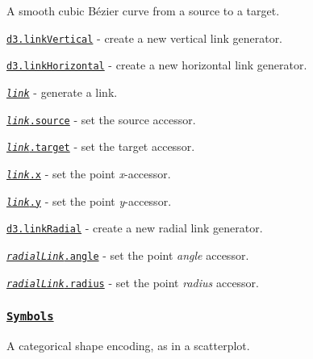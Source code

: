 A smooth cubic Bézier curve from a source to a target.


\begin{DoxyItemize}
\item \href{https://github.com/d3/d3-shape/blob/master/README.md#linkVertical}{\tt d3.\+link\+Vertical} -\/ create a new vertical link generator.
\item \href{https://github.com/d3/d3-shape/blob/master/README.md#linkHorizontal}{\tt d3.\+link\+Horizontal} -\/ create a new horizontal link generator.
\item \href{https://github.com/d3/d3-shape/blob/master/README.md#_link}{\tt {\itshape link}} -\/ generate a link.
\item \href{https://github.com/d3/d3-shape/blob/master/README.md#link_source}{\tt {\itshape link}.source} -\/ set the source accessor.
\item \href{https://github.com/d3/d3-shape/blob/master/README.md#link_target}{\tt {\itshape link}.target} -\/ set the target accessor.
\item \href{https://github.com/d3/d3-shape/blob/master/README.md#link_x}{\tt {\itshape link}.x} -\/ set the point {\itshape x}-\/accessor.
\item \href{https://github.com/d3/d3-shape/blob/master/README.md#link_y}{\tt {\itshape link}.y} -\/ set the point {\itshape y}-\/accessor.
\item \href{https://github.com/d3/d3-shape/blob/master/README.md#linkRadial}{\tt d3.\+link\+Radial} -\/ create a new radial link generator.
\item \href{https://github.com/d3/d3-shape/blob/master/README.md#radialLink_angle}{\tt {\itshape radial\+Link}.angle} -\/ set the point {\itshape angle} accessor.
\item \href{https://github.com/d3/d3-shape/blob/master/README.md#radialLink_radius}{\tt {\itshape radial\+Link}.radius} -\/ set the point {\itshape radius} accessor.
\end{DoxyItemize}

\subsubsection*{\href{https://github.com/d3/d3-shape/blob/master/README.md#symbols}{\tt Symbols}}

A categorical shape encoding, as in a scatterplot.


